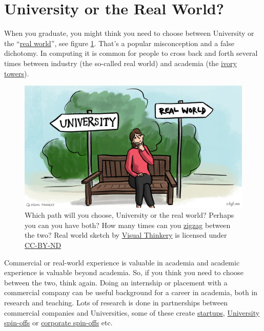\documentclass[
]{book}
\begin{document}
\hypertarget{realworld}{%
\section{University or the Real World?}\label{realworld}}

When you graduate, you might think you need to choose between University or the ``\href{https://en.wikipedia.org/wiki/Real_life}{real world}'', see figure \ref{fig:realworld-fig}. That's a popular misconception and a false dichotomy. In computing it is common for people to cross back and forth several times between industry (the so-called real world) and academia (the \href{https://en.wikipedia.org/wiki/Ivory_tower}{ivory towers}).

\begin{figure}

{\centering \includegraphics[width=1\linewidth]{images/University-or-real-world} 

}

\caption{Which path will you choose, University or the real world? Perhaps you can you have both? How many times can you \href{https://en.wikipedia.org/wiki/Zigzag}{zigzag} between the two? Real world sketch by \href{https://visualthinkery.com/}{Visual Thinkery} is licensed under \href{https://creativecommons.org/licenses/by-nd/4.0/}{CC-BY-ND}}\label{fig:realworld-fig}
\end{figure}



Commercial or real-world experience is valuable in academia and academic experience is valuable beyond academia. So, if you think you need to choose between the two, think again. Doing an internship or placement with a commercial company can be useful background for a career in academia, both in research and teaching. Lots of research is done in partnerships between commercial companies and Universities, some of these create \href{https://en.wikipedia.org/wiki/Startup_company}{startups}, \href{https://en.wikipedia.org/wiki/University_spin-off}{University spin-offs} or \href{https://en.wikipedia.org/wiki/Corporate_spin-off}{corporate spin-offs} etc.
\end{document}
